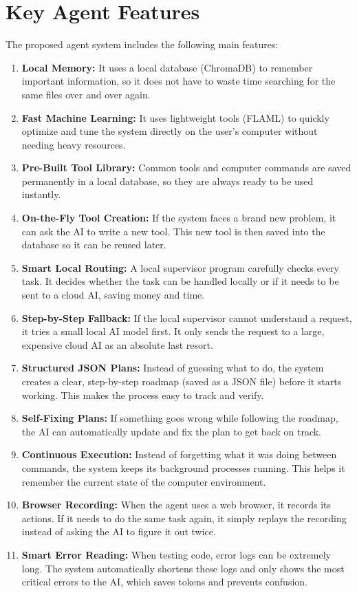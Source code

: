 \section{Key Agent Features}
The proposed agent system includes the following main features:\\
\begin{enumerate}
    \item \textbf{Local Memory:} It uses a local database (ChromaDB) to remember important information, so it does not have to waste time searching for the same files over and over again.
    \item \textbf{Fast Machine Learning:} It uses lightweight tools (FLAML) to quickly optimize and tune the system directly on the user's computer without needing heavy resources.
    \item \textbf{Pre-Built Tool Library:} Common tools and computer commands are saved permanently in a local database, so they are always ready to be used instantly.
    \item \textbf{On-the-Fly Tool Creation:} If the system faces a brand new problem, it can ask the AI to write a new tool. This new tool is then saved into the database so it can be reused later.
    \item \textbf{Smart Local Routing:} A local supervisor program carefully checks every task. It decides whether the task can be handled locally or if it needs to be sent to a cloud AI, saving money and time.
    \item \textbf{Step-by-Step Fallback:} If the local supervisor cannot understand a request, it tries a small local AI model first. It only sends the request to a large, expensive cloud AI as an absolute last resort.
    \item \textbf{Structured JSON Plans:} Instead of guessing what to do, the system creates a clear, step-by-step roadmap (saved as a JSON file) before it starts working. This makes the process easy to track and verify.
    \item \textbf{Self-Fixing Plans:} If something goes wrong while following the roadmap, the AI can automatically update and fix the plan to get back on track.
    \item \textbf{Continuous Execution:} Instead of forgetting what it was doing between commands, the system keeps its background processes running. This helps it remember the current state of the computer environment.
    \item \textbf{Browser Recording:} When the agent uses a web browser, it records its actions. If it needs to do the same task again, it simply replays the recording instead of asking the AI to figure it out twice.
    \item \textbf{Smart Error Reading:} When testing code, error logs can be extremely long. The system automatically shortens these logs and only shows the most critical errors to the AI, which saves tokens and prevents confusion.
\end{enumerate}

